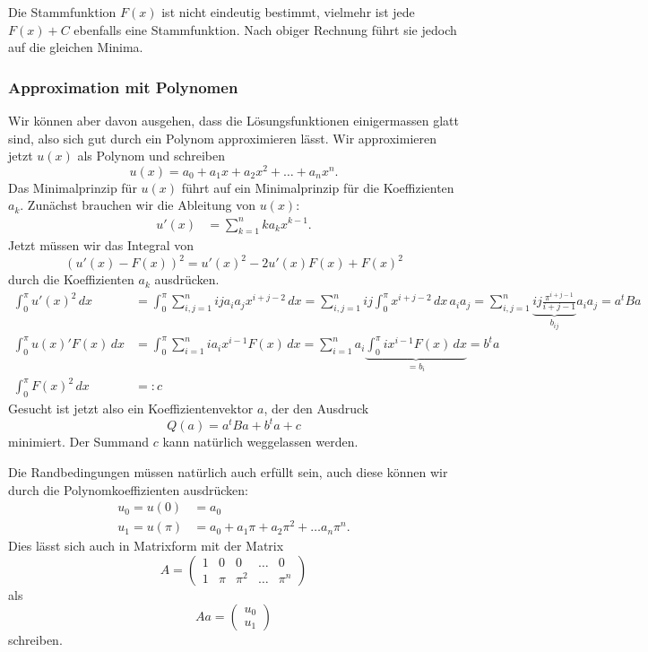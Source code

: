 Die Stammfunktion $F(x)$ ist nicht eindeutig bestimmt, vielmehr
ist jede $F(x)+C$ ebenfalls eine Stammfunktion.
Nach obiger Rechnung führt sie jedoch auf die gleichen Minima.

\subsubsection{Approximation mit Polynomen}
Wir können aber davon ausgehen, dass die Lösungsfunktionen einigermassen
glatt sind, also sich gut durch ein Polynom approximieren lässt.
Wir approximieren jetzt $u(x)$ als Polynom und schreiben
\[
u(x) = a_0 + a_1x + a_2x^2 + \dots + a_nx^n.
\]
Das Minimalprinzip für $u(x)$ führt auf ein Minimalprinzip für 
die Koeffizienten $a_k$.
Zunächst brauchen wir die Ableitung von $u(x)$:
\begin{align*}
u'(x) &= \sum_{k=1}^n ka_kx^{k-1}.
\end{align*}
Jetzt müssen wir das Integral von
\[
(u'(x)-F(x))^2
=
u'(x)^2 - 2u'(x)F(x) + F(x)^2
\]
durch 
die Koeffizienten $a_k$ ausdrücken.
\begin{align*}
\int_0^\pi u'(x)^2\,dx
&=
\int_0^\pi
\sum_{i,j=1}^n ija_ia_jx^{i+j-2}
\,dx
=
\sum_{i,j=1}^n ij \int_0^\pi x^{i+j-2}\,dx\, a_ia_j
=
\sum_{i,j=1}^n
\underbrace{ij \frac{\pi^{i+j-1}}{i+j-1}}_{\displaystyle b_{ij}}
a_ia_j
=
a^tBa
\\
\int_0^\pi u(x)'F(x) \,dx
&=
\int_0^\pi \sum_{i=1}^n ia_i x^{i-1} F(x) \,dx
=
\sum_{i=1}^n
a_i
\underbrace{\int_0^\pi 
ix^{i-1} F(x)\,dx}_{\displaystyle =b_i}
=
b^t a
\\
\int_0^\pi F(x)^2\,dx &=: c
\end{align*}
Gesucht ist jetzt also ein Koeffizientenvektor $a$, der den
Ausdruck
\[
Q(a) = a^t B a + b^t a + c
\]
minimiert.
Der Summand $c$ kann natürlich weggelassen werden.

Die Randbedingungen müssen natürlich auch erfüllt sein, auch
diese können wir durch die Polynomkoeffizienten ausdrücken:
\begin{align*}
u_0=u(0)   &= a_0
\\
u_1=u(\pi) &= a_0 + a_1\pi + a_2\pi^2+\dots a_n\pi^n.
\end{align*}
Dies lässt sich auch in Matrixform mit der Matrix
\[
A=\begin{pmatrix}
1&0&0&\dots&0\\
1&\pi&\pi^2&\dots&\pi^n
\end{pmatrix}
\]
als
\[
Aa = \begin{pmatrix}u_0\\u_1\end{pmatrix}
\]
schreiben.

